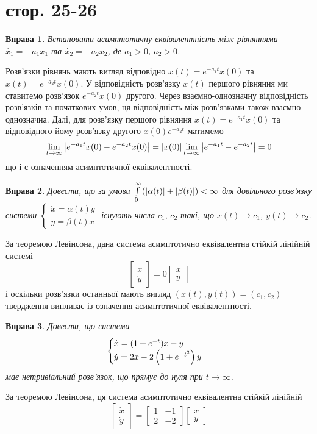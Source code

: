 \documentclass[12pt]{article} %
\newtheorem{prob}{Вправа}
\begin{document}
\section{стор. 25-26}
\begin{prob}Встановити асимптотичну еквівалентність між рівняннями $\dot{x_1}=-a_1x_1$ та $\dot{x_2}=-a_2x_2$, де $a_1>0$, $a_2>0$.
\end{prob}
Розв’язки рівнянь мають вигляд відповідно $x(t)=e^{-a_1t}x(0)$ та $x(t)=e^{-a_2t}x(0)$. У відповідність розв’язку $x(t)$ першого
рівняння ми ставитемо розв'язок $e^{-a_2t}x(0)$ другого. Через взаємно-однозначну відповідність розв’язків та початкових умов, ця
відповідність між розв’язками також взаємно-однозначна. Далі, для розв’язку першого рівняння $x(t)=e^{-a_1t}x(0)$
та відповідного йому розв’язку другого $x(0)e^{-a_2t}$ матимемо
\[\lim_{t\to\infty}\myabs{e^{-a_1t}x(0)-e^{-a_2t}x(0)}=\myabs{x(0)}\lim_{t\to\infty}\myabs{e^{-a_1t}-e^{-a_2t}}=0\]
що і є означенням асимптотичної еквівалентності.
\begin{prob}Довести, що за умови $\int_0^\infty\mybra{\myabs{\alpha(t)}+\myabs{\beta(t)}}<\infty$ для довільного розв’язку системи
$\begin{cases}\dot{x}=\alpha(t)y\\\dot{y}=\beta(t)x\end{cases}$ існують числа $c_1,\,c_2$ такі, що $x(t)\to c_1$, $y(t)\to c_2$.
\end{prob}
За теоремою Левінсона, дана система асимптотично еквівалентна стійкій лінійній системі
\[\begin{bmatrix}\dot{x}\\\dot{y}\end{bmatrix}=0\begin{bmatrix}x\\y\end{bmatrix}\]
і оскільки розв’язки останньої мають вигляд $(x(t),y(t))=(c_1,c_2)$ твердження випливає із означення асимптотичної еквівалентності.
\begin{prob}Довести, що система
\[\begin{cases}\dot{x}=(1+e^{-t})x-y\\\dot{y}=2x-2\left(1+e^{-t^2}\right)y\end{cases}\]
має нетривіальний розв’язок, що прямує до нуля при $t\to\infty$.
\end{prob}
За теоремою Левінсона, ця система асимптотично еквівалентна стійкій лінійній
\[\begin{bmatrix}\dot{x}\\\dot{y}\end{bmatrix}=\begin{bmatrix}1&-1\\2&-2\end{bmatrix}\begin{bmatrix}x\\y\end{bmatrix}\]
\end{document}
